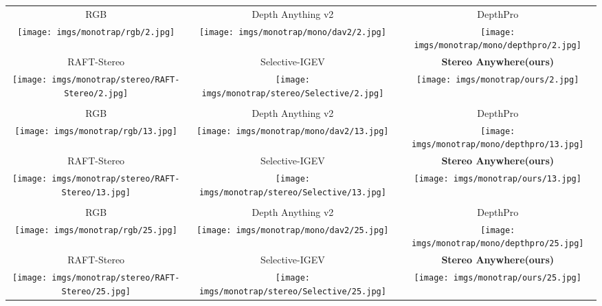 \documentclass[10pt,twocolumn,letterpaper]{article}
\newcommand{\method}[0]{Stereo Anywhere\xspace}
\begin{document}
\begin{figure*}[h]
    \centering
    \renewcommand{\tabcolsep}{1pt}
    \begin{tabular}{ccc}
        \small RGB &
        \small Depth Anything v2 \cite{depth_anything_v2} &
        \small DepthPro \cite{depthpro} \\
        \texttt{[image: imgs/monotrap/rgb/2.jpg]} &
        \texttt{[image: imgs/monotrap/mono/dav2/2.jpg]}  &
        \texttt{[image: imgs/monotrap/mono/depthpro/2.jpg]} \\
        \small RAFT-Stereo \cite{lipson2021raft} &
        \small Selective-IGEV \cite{wang2024selective} &
        \textbf{\method (ours)} \\
        \texttt{[image: imgs/monotrap/stereo/RAFT-Stereo/2.jpg]} &
        \texttt{[image: imgs/monotrap/stereo/Selective/2.jpg]} &
        \texttt{[image: imgs/monotrap/ours/2.jpg]} \\ \\
        \small RGB &
        \small Depth Anything v2 \cite{depth_anything_v2} &
        \small DepthPro \cite{depthpro} \\
        \texttt{[image: imgs/monotrap/rgb/13.jpg]} &
        \texttt{[image: imgs/monotrap/mono/dav2/13.jpg]}  &
        \texttt{[image: imgs/monotrap/mono/depthpro/13.jpg]} \\
        \small RAFT-Stereo \cite{lipson2021raft} &
        \small Selective-IGEV \cite{wang2024selective} &
        \textbf{\method (ours)} \\
        \texttt{[image: imgs/monotrap/stereo/RAFT-Stereo/13.jpg]} &
        \texttt{[image: imgs/monotrap/stereo/Selective/13.jpg]} &
        \texttt{[image: imgs/monotrap/ours/13.jpg]} \\ \\
        \small RGB &
        \small Depth Anything v2 \cite{depth_anything_v2} &
        \small DepthPro \cite{depthpro} \\
        \texttt{[image: imgs/monotrap/rgb/25.jpg]} &
        \texttt{[image: imgs/monotrap/mono/dav2/25.jpg]}  &
        \texttt{[image: imgs/monotrap/mono/depthpro/25.jpg]} \\
        \small RAFT-Stereo \cite{lipson2021raft} &
        \small Selective-IGEV \cite{wang2024selective} &
        \textbf{\method (ours)} \\
        \texttt{[image: imgs/monotrap/stereo/RAFT-Stereo/25.jpg]} &
        \texttt{[image: imgs/monotrap/stereo/Selective/25.jpg]} &
        \texttt{[image: imgs/monotrap/ours/25.jpg]} \\
    \end{tabular}

    \caption{\textbf{Qualitative Results -- MonoTrap.} Predictions by state-of-the-art models and \method.}
    \label{fig:qual_monotrap2}\vspace{-0.3cm}

\end{figure*}
\end{document}
